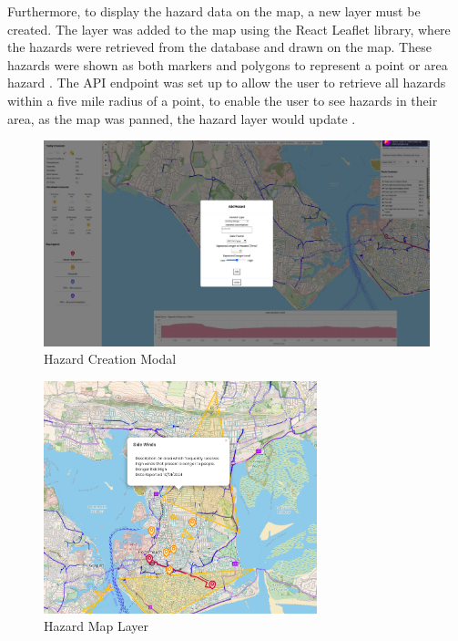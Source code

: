 Furthermore, to display the hazard data on the map, a new layer must be created. The layer was added to the map using the React Leaflet library, where the hazards were retrieved from the database and drawn on the map. These hazards were shown as both markers and polygons to represent a point or area hazard . The API endpoint was set up to allow the user to retrieve all hazards within a five mile radius of a point, to enable the user to see hazards in their area, as the map was panned, the hazard layer would update .

\begin{figure}[!ht]
  \centering
  \includegraphics[width=425px]{figures/Progress Images/Iteration-2/SR32-37/sr32-add-hazard-point.png}
  \caption{Hazard Creation Modal}
  \label{fig:hazard-creation}
\end{figure}

\begin{figure}[!ht]
  \centering
  \includegraphics[width=300px]{figures/Progress Images/Iteration-2/SR32-37/sr32-hazard-popup.png}
  \caption{Hazard Map Layer}
  \label{fig:hazard-layer}
\end{figure}

